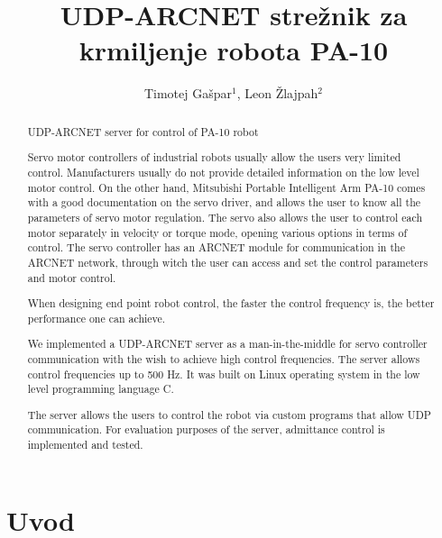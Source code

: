 \documentclass[a4paper]{article}
\begin{document}
\title{UDP-ARCNET strežnik za krmiljenje robota PA-10}

\author{Timotej Gašpar$^{1}$, Leon Žlajpah$^{2}$} %



\maketitle


\begin{abstract}{UDP-ARCNET server for control of PA-10 robot}

Servo motor controllers of industrial robots usually allow the users very limited control. Manufacturers usually do not provide detailed information on the low level motor control. On the other hand, Mitsubishi Portable Intelligent Arm PA-10 comes with a good documentation on the servo driver, and allows the user to know all the parameters of servo motor regulation. The servo also allows the user to control each motor separately in velocity or torque mode, opening various options in terms of control. The servo controller has an ARCNET module for communication in the ARCNET network, through witch the user can access and set the control parameters and motor control.

When designing end point robot control, the faster the control frequency is, the better performance one can achieve. 

We implemented a UDP-ARCNET server as a man-in-the-middle for servo controller communication with the wish to achieve high control frequencies. The server allows control frequencies up to 500 Hz. It was built on Linux operating system in the low level programming language C.

The server allows the users to control the robot via custom programs that allow UDP communication. For evaluation purposes of the server, admittance control is implemented and tested.

\end{abstract}



\section{Uvod}
\end{document}
